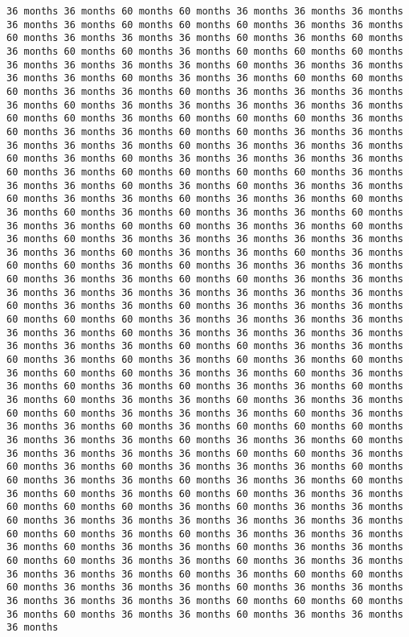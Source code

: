\documentclass[11pt]{article}
\begin{document}
\begin{Verbatim}[commandchars=\\\{\}, frame=single, framerule=2mm, rulecolor=\color{outerrorbackground}]
36 months 36 months 60 months 60 months 36 months 36 months 36 months 36 months 36 months 60 months 60 months 60 months 36 months 36 months 60 months 36 months 36 months 36 months 60 months 36 months 60 months 36 months 60 months 60 months 36 months 60 months 60 months 60 months 36 months 36 months 36 months 36 months 60 months 36 months 36 months 36 months 36 months 60 months 36 months 36 months 60 months 60 months 60 months 36 months 36 months 60 months 36 months 36 months 36 months 36 months 60 months 36 months 36 months 36 months 36 months 36 months 60 months 60 months 36 months 60 months 60 months 60 months 36 months 60 months 36 months 36 months 60 months 60 months 36 months 36 months 36 months 36 months 36 months 60 months 36 months 36 months 36 months 60 months 36 months 60 months 36 months 36 months 36 months 36 months 60 months 36 months 60 months 60 months 60 months 60 months 36 months 36 months 36 months 60 months 36 months 60 months 36 months 36 months 60 months 36 months 36 months 60 months 36 months 36 months 60 months 36 months 60 months 36 months 60 months 36 months 36 months 60 months 36 months 36 months 60 months 60 months 36 months 36 months 60 months 36 months 60 months 36 months 36 months 36 months 36 months 36 months 36 months 36 months 60 months 36 months 36 months 60 months 36 months 60 months 60 months 36 months 60 months 36 months 36 months 36 months 60 months 36 months 36 months 60 months 60 months 36 months 36 months 36 months 36 months 36 months 36 months 36 months 36 months 36 months 60 months 36 months 36 months 60 months 36 months 36 months 36 months 60 months 60 months 60 months 36 months 36 months 36 months 36 months 36 months 36 months 60 months 36 months 36 months 36 months 36 months 36 months 36 months 36 months 60 months 60 months 36 months 36 months 60 months 36 months 60 months 36 months 60 months 36 months 60 months 36 months 60 months 60 months 36 months 36 months 60 months 36 months 36 months 60 months 36 months 60 months 36 months 36 months 60 months 36 months 60 months 36 months 36 months 60 months 36 months 36 months 60 months 60 months 36 months 36 months 36 months 60 months 36 months 36 months 36 months 60 months 36 months 60 months 60 months 60 months 36 months 36 months 36 months 60 months 36 months 36 months 60 months 36 months 36 months 36 months 36 months 60 months 60 months 36 months 60 months 36 months 60 months 36 months 36 months 36 months 60 months 60 months 36 months 36 months 60 months 36 months 36 months 60 months 36 months 60 months 36 months 60 months 60 months 36 months 36 months 60 months 60 months 60 months 36 months 60 months 36 months 36 months 60 months 36 months 36 months 36 months 36 months 36 months 36 months 60 months 60 months 36 months 60 months 36 months 36 months 36 months 36 months 60 months 36 months 36 months 60 months 36 months 36 months 60 months 60 months 36 months 36 months 60 months 36 months 36 months 36 months 36 months 36 months 60 months 36 months 60 months 60 months 60 months 36 months 36 months 36 months 60 months 36 months 36 months 36 months 36 months 36 months 36 months 60 months 60 months 60 months 36 months 60 months 36 months 36 months 60 months 36 months 36 months 36 months 
\end{Verbatim}
\end{document}
